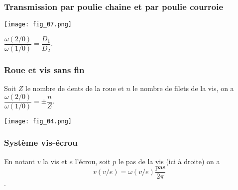 \subsubsection{Transmission par poulie chaine et par poulie courroie}
\begin{table*}[!h]
\begin{minipage}[c]{.6\linewidth}
\begin{center}
\texttt{[image: fig\_07.png]}
\end{center}
\end{minipage}\hfill
\begin{minipage}[c]{.4\linewidth}
\begin{resultat}

$\dfrac{\omega(2/0)}{\omega(1/0)} = \dfrac{D_1}{D_2}$.
\end{resultat}
\end{minipage}
\end{table*}

\subsubsection{Roue et vis sans fin}
\begin{table*}[!h]
\begin{minipage}[c]{.4\linewidth}
\begin{resultat}
Soit $Z$ le nombre de dents de la roue et $n$ le nombre de filets de la vis, on a 
$\dfrac{\omega(2/0)}{\omega(1/0)} = \pm \dfrac{n}{Z}$.
\end{resultat}
\end{minipage}\hfill
\begin{minipage}[c]{.6\linewidth}
\begin{center}
\texttt{[image: fig\_04.png]}
\end{center}
\end{minipage}
\end{table*}


\subsubsection{Système vis-écrou}
\begin{resultat}
En notant $v$ la vis et $e$ l'écrou, soit $p$ le pas de la vis (ici à droite) on a 
$$v(v/e)=\omega(v/e) \dfrac{\text{pas}}{2 \pi}$$.
\end{resultat}

